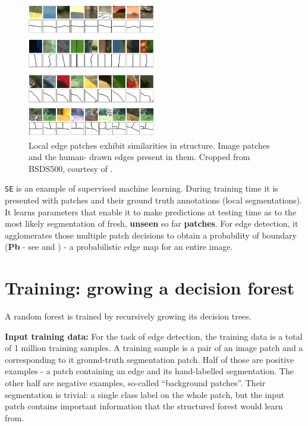 \begin{figure}[t]
\centering
 \includegraphics[width=0.5\textwidth]{images/srf/structure-in-edge-patches.png}
\caption[Local patches exhibit similarities in edge structure]{Local edge patches exhibit similarities in structure. Image patches and the human-%
drawn edges present in them. Cropped from BSDS500, courtesy of \cite{DollarICCV13PresentationSlides}.}
\label{fig:srf-structure-in-edge-patches}
\end{figure}

{\tt SE} is an example of supervised machine learning. During training time it is presented with patches and their ground truth annotations (local segmentations). It learns parameters that enable it to make predictions at testing time as to the most likely segmentation of fresh, {\bf unseen} so far {\bf patches}. For edge detection, it agglomerates those multiple patch decisions to obtain a probability of boundary ({\bf Pb} - see  and ) - a probabilistic edge map for an entire image.

\section{Training: growing a decision forest}
A random forest is trained by recursively growing its decision trees. 

\textbf{Input training data:} For the task of edge detection, the training data is a total of 1 million training samples. A training sample is a pair of an image patch and a corresponding to it ground-truth segmentation patch. Half of those are positive examples - a patch containing an edge and its hand-labelled segmentation. The other half are negative examples, so-called ``background patches''. Their segmentation is trivial: a single class label on the whole patch, but the input patch contains important information that the structured forest would learn from. 

